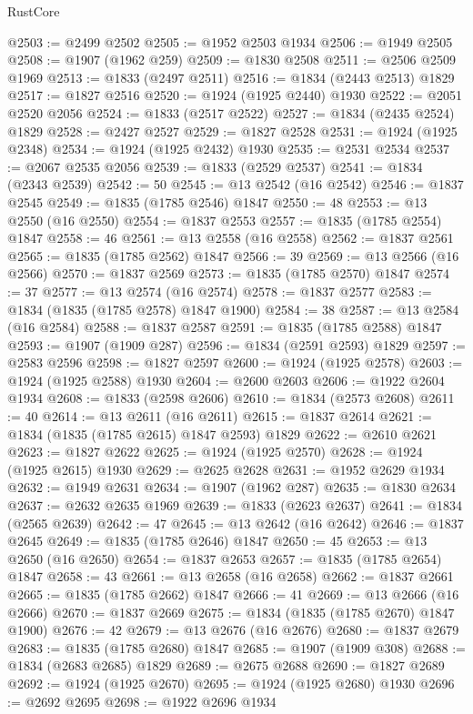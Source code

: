 \begin{lexlean}{RustCore}
\begin{coremodule}
@2503 := @2499 @2502
@2505 := @1952 @2503 @1934
@2506 := @1949 @2505
@2508 := @1907 (@1962 @259)
@2509 := @1830 @2508
@2511 := @2506 @2509 @1969
@2513 := @1833 (@2497 @2511)
@2516 := @1834 (@2443 @2513) @1829
@2517 := @1827 @2516
@2520 := @1924 (@1925 @2440) @1930
@2522 := @2051 @2520 @2056
@2524 := @1833 (@2517 @2522)
@2527 := @1834 (@2435 @2524) @1829
@2528 := @2427 @2527
@2529 := @1827 @2528
@2531 := @1924 (@1925 @2348)
@2534 := @1924 (@1925 @2432) @1930
@2535 := @2531 @2534
@2537 := @2067 @2535 @2056
@2539 := @1833 (@2529 @2537)
@2541 := @1834 (@2343 @2539)
@2542 := 50
@2545 := @13 @2542 (@16 @2542)
@2546 := @1837 @2545
@2549 := @1835 (@1785 @2546) @1847
@2550 := 48
@2553 := @13 @2550 (@16 @2550)
@2554 := @1837 @2553
@2557 := @1835 (@1785 @2554) @1847
@2558 := 46
@2561 := @13 @2558 (@16 @2558)
@2562 := @1837 @2561
@2565 := @1835 (@1785 @2562) @1847
@2566 := 39
@2569 := @13 @2566 (@16 @2566)
@2570 := @1837 @2569
@2573 := @1835 (@1785 @2570) @1847
@2574 := 37
@2577 := @13 @2574 (@16 @2574)
@2578 := @1837 @2577
@2583 := @1834 (@1835 (@1785 @2578) @1847 @1900)
@2584 := 38
@2587 := @13 @2584 (@16 @2584)
@2588 := @1837 @2587
@2591 := @1835 (@1785 @2588) @1847
@2593 := @1907 (@1909 @287)
@2596 := @1834 (@2591 @2593) @1829
@2597 := @2583 @2596
@2598 := @1827 @2597
@2600 := @1924 (@1925 @2578)
@2603 := @1924 (@1925 @2588) @1930
@2604 := @2600 @2603
@2606 := @1922 @2604 @1934
@2608 := @1833 (@2598 @2606)
@2610 := @1834 (@2573 @2608)
@2611 := 40
@2614 := @13 @2611 (@16 @2611)
@2615 := @1837 @2614
@2621 := @1834 (@1835 (@1785 @2615) @1847 @2593) @1829
@2622 := @2610 @2621
@2623 := @1827 @2622
@2625 := @1924 (@1925 @2570)
@2628 := @1924 (@1925 @2615) @1930
@2629 := @2625 @2628
@2631 := @1952 @2629 @1934
@2632 := @1949 @2631
@2634 := @1907 (@1962 @287)
@2635 := @1830 @2634
@2637 := @2632 @2635 @1969
@2639 := @1833 (@2623 @2637)
@2641 := @1834 (@2565 @2639)
@2642 := 47
@2645 := @13 @2642 (@16 @2642)
@2646 := @1837 @2645
@2649 := @1835 (@1785 @2646) @1847
@2650 := 45
@2653 := @13 @2650 (@16 @2650)
@2654 := @1837 @2653
@2657 := @1835 (@1785 @2654) @1847
@2658 := 43
@2661 := @13 @2658 (@16 @2658)
@2662 := @1837 @2661
@2665 := @1835 (@1785 @2662) @1847
@2666 := 41
@2669 := @13 @2666 (@16 @2666)
@2670 := @1837 @2669
@2675 := @1834 (@1835 (@1785 @2670) @1847 @1900)
@2676 := 42
@2679 := @13 @2676 (@16 @2676)
@2680 := @1837 @2679
@2683 := @1835 (@1785 @2680) @1847
@2685 := @1907 (@1909 @308)
@2688 := @1834 (@2683 @2685) @1829
@2689 := @2675 @2688
@2690 := @1827 @2689
@2692 := @1924 (@1925 @2670)
@2695 := @1924 (@1925 @2680) @1930
@2696 := @2692 @2695
@2698 := @1922 @2696 @1934

\end{coremodule}
\end{lexlean}
